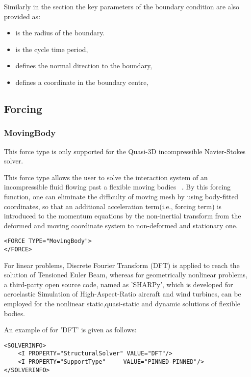 Similarly in the  section the key parameters of the boundary condition are also provided as:
\begin{itemize}
\item {} is the radius of the boundary.
\item {} is the cycle time period,
\item {} defines the normal direction to the boundary,
\item {}  defines a coordinate in the boundary centre,
\end{itemize}


\subsection{Forcing}
\subsubsection{MovingBody}\label{s:forcing:MovingBody}

\begin{notebox}
This force type is only supported for the Quasi-3D incompressible Navier-Stokes solver.
\end{notebox}

This force type allows the user to solve the interaction system of an incompressible fluid flowing past a flexible moving bodies ~\cite{NeKa97}. By this forcing function, one can eliminate the difficulty of moving mesh by using body-fitted coordinates, so that an additional acceleration term(i.e., forcing term) is introduced to the momentum equations by the non-inertial transform from the deformed and moving coordinate system to non-deformed and stationary one.

\begin{lstlisting}[style=XMLStyle]
<FORCE TYPE="MovingBody">
</FORCE>
\end{lstlisting}

For linear problems, Discrete Fourier Transform (DFT) is applied to reach the solution of Tensioned Euler Beam, whereas for geometrically nonlinear problems, a third-party open source code, named as 'SHARPy', which is developed for aeroelastic Simulation of High-Aspect-Ratio aircraft and wind turbines, can be employed for the nonlinear static,quasi-static and dynamic solutions of flexible bodies.  

An example of  for 'DFT' is given as follows:
\begin{lstlisting}[style=XMLStyle]
<SOLVERINFO>
	<I PROPERTY="StructuralSolver" VALUE="DFT"/>
	<I PROPERTY="SupportType"     VALUE="PINNED-PINNED"/>
</SOLVERINFO>
\end{lstlisting}
 
